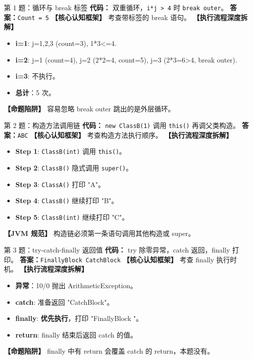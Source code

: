 ﻿\documentclass[12pt, a4paper]{ctexart}
\begin{document}
\begin{bluebox}{第 1 题：循环与 break 标签}
	\textbf{代码：} 双重循环，\texttt{i*j > 4} 时 \texttt{break outer}。
	\textbf{答案：}\texttt{Count = 5}
	\textbf{【核心认知框架】} 考查带标签的 break 语句。
	\textbf{【执行流程深度拆解】}
	\begin{itemize}[leftmargin=*, nosep]
		\item \textbf{i=1}: j=1,2,3 (count=3), 1*3<=4.
		\item \textbf{i=2}: j=1 (count=4), j=2 (2*2=4, count=5), j=3 (2*3=6>4, break outer).
		\item \textbf{i=3}: 不执行。
		\item \textbf{总计}：5 次。
	\end{itemize}
	\textbf{【命题陷阱】} 容易忽略 break outer 跳出的是外层循环。
\end{bluebox}

\begin{bluebox}{第 2 题：构造方法调用链}
	\textbf{代码：} \texttt{new ClassB(1)} 调用 \texttt{this()} 再调父类构造。
	\textbf{答案：}\texttt{ABC}
	\textbf{【核心认知框架】} 考查构造方法执行顺序。
	\textbf{【执行流程深度拆解】}
	\begin{itemize}[leftmargin=*, nosep]
		\item \textbf{Step 1}: \texttt{ClassB(int)} 调用 \texttt{this()}。
		\item \textbf{Step 2}: \texttt{ClassB()} 隐式调用 \texttt{super()}。
		\item \textbf{Step 3}: \texttt{ClassA()} 打印 "A"。
		\item \textbf{Step 4}: \texttt{ClassB()} 继续打印 "B"。
		\item \textbf{Step 5}: \texttt{ClassB(int)} 继续打印 "C"。
	\end{itemize}
	\textbf{【JVM 规范】} 构造链必须第一条语句调用其他构造或 super。
\end{bluebox}

\begin{bluebox}{第 3 题：try-catch-finally 返回值}
	\textbf{代码：} try 除零异常，catch 返回，finally 打印。
	\textbf{答案：}\texttt{FinallyBlock CatchBlock}
	\textbf{【核心认知框架】} 考查 finally 执行时机。
	\textbf{【执行流程深度拆解】}
	\begin{itemize}[leftmargin=*, nosep]
		\item \textbf{异常}：10/0 抛出 ArithmeticException。
		\item \textbf{catch}: 准备返回 "CatchBlock"。
		\item \textbf{finally}: \textbf{优先执行}，打印 "FinallyBlock "。
		\item \textbf{return}:  finally 结束后返回 catch 的值。
	\end{itemize}
	\textbf{【命题陷阱】} finally 中有 return 会覆盖 catch 的 return，本题没有。
\end{bluebox}
\end{document}
